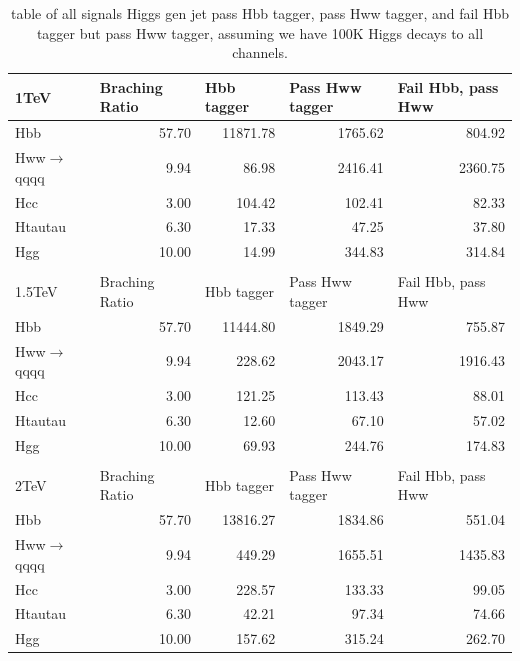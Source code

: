 \begin{table}[htbp]
\caption{}
\begin{tabular}{|l|r|r|r|r|}
\hline
1TeV & \multicolumn{1}{l|}{Braching Ratio} & \multicolumn{1}{l|}{Hbb tagger} & \multicolumn{1}{l|}{Pass Hww tagger} & \multicolumn{1}{l|}{Fail Hbb, pass Hww} \\ \hline
Hbb & 57.70 & 11871.78 & 1765.62 & 804.92 \\ \hline
Hww$\to$qqqq & 9.94 & 86.98 & 2416.41 & 2360.75 \\ \hline
Hcc & 3.00 & 104.42 & 102.41 & 82.33 \\ \hline
Htautau & 6.30 & 17.33 & 47.25 & 37.80 \\ \hline
Hgg & 10.00 & 14.99 & 344.83 & 314.84 \\ \hline
 & \multicolumn{1}{l|}{} & \multicolumn{1}{l|}{} & \multicolumn{1}{l|}{} & \multicolumn{1}{l|}{} \\ \hline
1.5TeV & \multicolumn{1}{l|}{Braching Ratio} & \multicolumn{1}{l|}{Hbb tagger} & \multicolumn{1}{l|}{Pass Hww tagger} & \multicolumn{1}{l|}{Fail Hbb, pass Hww} \\ \hline
Hbb & 57.70 & 11444.80 & 1849.29 & 755.87 \\ \hline
Hww$\to$qqqq & 9.94 & 228.62 & 2043.17 & 1916.43 \\ \hline
Hcc & 3.00 & 121.25 & 113.43 & 88.01 \\ \hline
Htautau & 6.30 & 12.60 & 67.10 & 57.02 \\ \hline
Hgg & 10.00 & 69.93 & 244.76 & 174.83 \\ \hline
 & \multicolumn{1}{l|}{} & \multicolumn{1}{l|}{} & \multicolumn{1}{l|}{} & \multicolumn{1}{l|}{} \\ \hline
2TeV & \multicolumn{1}{l|}{Braching Ratio} & \multicolumn{1}{l|}{Hbb tagger} & \multicolumn{1}{l|}{Pass Hww tagger} & \multicolumn{1}{l|}{Fail Hbb, pass Hww} \\ \hline
Hbb & 57.70 & 13816.27 & 1834.86 & 551.04 \\ \hline
Hww$\to$qqqq & 9.94 & 449.29 & 1655.51 & 1435.83 \\ \hline
Hcc & 3.00 & 228.57 & 133.33 & 99.05 \\ \hline
Htautau & 6.30 & 42.21 & 97.34 & 74.66 \\ \hline
Hgg & 10.00 & 157.62 & 315.24 & 262.70 \\ \hline
\end{tabular}
\label{table:HbbHww}
\caption{table of all signals Higgs gen jet pass Hbb tagger, pass Hww tagger, and fail Hbb tagger but pass Hww tagger, assuming we have 100K Higgs decays to all channels.}
\end{table}


